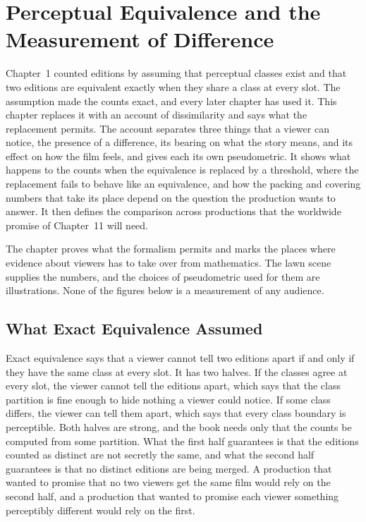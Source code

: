 \documentclass[11pt,twoside,openright]{book}
\theoremstyle{plain}
\theoremstyle{definition}
\theoremstyle{remark}
\begin{document}
\chapter{Perceptual Equivalence and the Measurement of Difference}
\label{ch:perceptual}

Chapter~1 counted editions by assuming that perceptual classes exist and that two editions are equivalent exactly when they share a class at every slot. The assumption made the counts exact, and every later chapter has used it. This chapter replaces it with an account of dissimilarity and says what the replacement permits. The account separates three things that a viewer can notice, the presence of a difference, its bearing on what the story means, and its effect on how the film feels, and gives each its own pseudometric. It shows what happens to the counts when the equivalence is replaced by a threshold, where the replacement fails to behave like an equivalence, and how the packing and covering numbers that take its place depend on the question the production wants to answer. It then defines the comparison across productions that the worldwide promise of Chapter~11 will need.

The chapter proves what the formalism permits and marks the places where evidence about viewers has to take over from mathematics. The lawn scene supplies the numbers, and the choices of pseudometric used for them are illustrations. None of the figures below is a measurement of any audience.

\section{What Exact Equivalence Assumed}\label{sec:assumed}

Exact equivalence says that a viewer cannot tell two editions apart if and only if they have the same class at every slot. It has two halves. If the classes agree at every slot, the viewer cannot tell the editions apart, which says that the class partition is fine enough to hide nothing a viewer could notice. If some class differs, the viewer can tell them apart, which says that every class boundary is perceptible. Both halves are strong, and the book needs only that the counts be computed from some partition. What the first half guarantees is that the editions counted as distinct are not secretly the same, and what the second half guarantees is that no distinct editions are being merged. A production that wanted to promise that no two viewers get the same film would rely on the second half, and a production that wanted to promise each viewer something perceptibly different would rely on the first.
\end{document}
